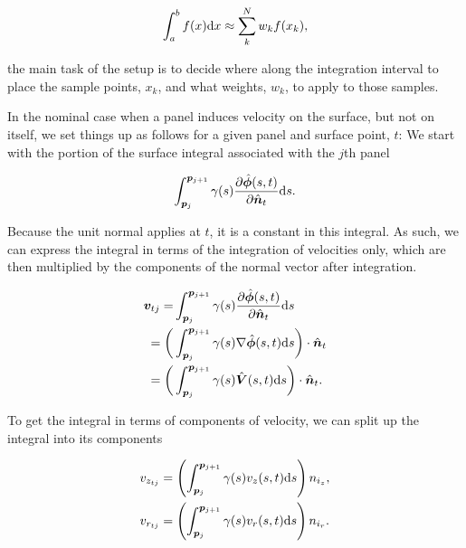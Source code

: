 \begin{equation}
    \int_a^b f(x) \mathrm{d} x \approx \sum_k^N w_k f(x_k),
\end{equation}

\where the main task of the setup is to decide where along the integration interval to place the sample points, \(x_k\), and what weights, \(w_k\), to apply to those samples.

In the nominal case when a panel induces velocity on the surface, but not on itself, we set things up as follows for a given panel and surface point, \(t\):
%
We start with the portion of the surface integral associated with the \(j\)th panel

\begin{equation}
    \int_{\bm{p}_j}^{\bm{p}_{j+1}} \gamma(s) \frac{\partial \hat{\bm{\phi}}(s,t)}{\partial \hat{\bm{n}}_t} \mathrm{d} s.
\end{equation}

Because the unit normal applies at \(t\), it is a constant in this integral.
%
As such, we can express the integral in terms of the integration of velocities only, which are then multiplied by the components of the normal vector after integration.

\begin{equation}
    \begin{aligned}
        \bm{v}_{tj} =&\int_{\bm{p}_j}^{\bm{p}_{j+1}} \gamma(s) \frac{\partial \hat{\bm{\phi}}(s,t)}{\partial \hat{\bm{n}}_t} \mathrm{d} s \\
        =\bigg(&\int_{\bm{p}_j}^{\bm{p}_{j+1}} \gamma(s) \nabla \hat{\bm{\phi}}(s,t) \mathrm{d} s\bigg)\cdot \hat{\bm{n}}_t \\
        =\bigg(&\int_{\bm{p}_j}^{\bm{p}_{j+1}} \gamma(s) \hat{\bm{V}}(s,t) \mathrm{d} s\bigg)\cdot \hat{\bm{n}}_t.
    \end{aligned}
\end{equation}

%
To get the integral in terms of components of velocity, we can split up the integral into its components

\begin{subequations}
    \begin{align}
        v_{z_{tj}} &=\left(\int_{\bm{p}_j}^{\bm{p}_{j+1}} \gamma(s) v_z(s,t) \mathrm{d} s \right)n_{i_z},\\
        v_{r_{tj}} &=\left(\int_{\bm{p}_j}^{\bm{p}_{j+1}} \gamma(s) v_r(s,t) \mathrm{d} s\right)n_{i_r}.
    \end{align}
\end{subequations}

